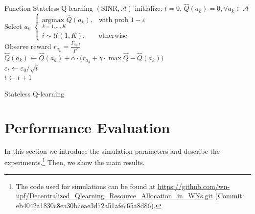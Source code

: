 \documentclass[conference]{IEEEtran}
\begin{document}
	\begin{algorithm}
		Function Stateless Q-learning $(\text{SINR},\mathcal{A})$\;
		initialize: $t=0$, $\hat{Q}(a_k) = 0, \forall a_k \in \mathcal{A}$\\
		{
			Select $a_k$  $\begin{cases}
			\underset{k=1,...,K}{\text{argmax }} \hat{Q}(a_k), & \text{with prob } 1 - \varepsilon\\
			i \sim \mathcal{U}(1, K), & \text{otherwise}
			\end{cases}$\\
			Observe reward $r_{a_k} = \frac{\Gamma_{a_k,t}}{\Gamma^*}$ \\
			$\hat{Q}(a_k) \leftarrow \hat{Q}(a_k) + \alpha \cdot \big(r_{a_k} + \gamma \cdot \max\hat{Q} - \hat{Q}(a_k)\big)$\\
			$\varepsilon_t \leftarrow \varepsilon_0 / \sqrt{t}$ \\	
			$ t \leftarrow t + 1$
		}
		\caption{Stateless Q-learning}
		\label{alg:qlearning}
	\end{algorithm}
	
	\section{Performance Evaluation}
	\label{section:performance_evaluation}	
	In this section we introduce the simulation parameters and describe the experiments.\footnote{The code used for simulations can be found at \url{https://github.com/wn-upf/Decentralized_Qlearning_Resource_Allocation_in_WNs.git} (Commit: eb4042a1830c8ea30b7eae3d72a51afe765a8d86).} Then, we show the main results.
	
\end{document}
